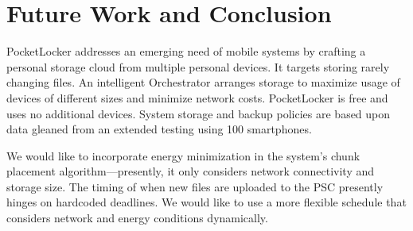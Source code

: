 
\section{Future Work and Conclusion}
\label{sec-conclusion}

PocketLocker addresses an emerging need of mobile systems by crafting a
personal storage cloud from multiple personal devices.  It targets storing
rarely changing files.  An intelligent Orchestrator
arranges storage to maximize usage of devices of different sizes and
minimize network costs.  PocketLocker is free and uses no additional devices.
System storage and backup policies are based upon data gleaned from an
extended testing using 100 smartphones.

We would like to incorporate energy minimization
in the system's chunk placement algorithm---presently, it only considers
network connectivity and storage size.  The timing of when new files are
uploaded to the PSC presently hinges on hardcoded deadlines.  We would like to
use a more flexible schedule that considers network and energy conditions
dynamically.

